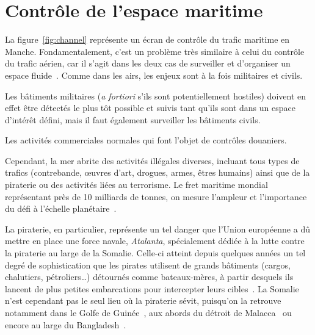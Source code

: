 \section{Contrôle de l'espace maritime}
	La figure~\ref{fig:channel} représente un écran de contrôle du trafic maritime en Manche. Fondamentalement, c'est un problème très similaire à celui du contrôle du trafic aérien, car il s'agit dans les deux cas de surveiller et d'organiser un espace fluide~\cite{henninger2012avant, henninger2013fluide}. Comme dans les airs, les enjeux sont à la fois militaires et civils.
	
	Les bâtiments militaires (\emph{a fortiori} s'ils sont potentiellement hostiles) doivent en effet être détectés le plus tôt possible et suivis tant qu'ils sont dans un espace d'intérêt défini, mais il faut également surveiller les bâtiments civils.
	
	Les activités commerciales normales qui font l'objet de contrôles douaniers.
	
	Cependant, la mer abrite des activités illégales diverses, incluant tous types de trafics (contrebande, œuvres d'art, drogues, armes, êtres humains) ainsi que de la piraterie ou des activités liées au terrorisme. Le fret maritime mondial représentant près de 10 milliards de tonnes, on mesure l'ampleur et l'importance du défi à l'échelle planétaire~\cite{unctad}.
	
	La piraterie, en particulier, représente un tel danger que l'Union européenne a dû mettre en place une force navale, \emph{Atalanta}\footnotemark, spécialement dédiée à la lutte contre la piraterie au large de la Somalie. Celle-ci atteint depuis quelques années un tel degré de sophistication que les pirates utilisent de grands bâtiments (cargos, chalutiers, pétroliers\ldots{}) détournés comme bateaux-mères, à partir desquels ils lancent de plus petites embarcations pour intercepter leurs cibles~\cite{audebaud2010lutte, guisnel2012pirates, dumas2015}. La Somalie n'est cependant pas le seul lieu où la piraterie sévit, puisqu'on la retrouve notamment dans le Golfe de Guinée~\cite{onuoha2012piracy}, aux abords du détroit de Malacca~\cite{raymond2009piracy} ou encore au large du Bangladesh~\cite{liss2011oceans}.
	
	
